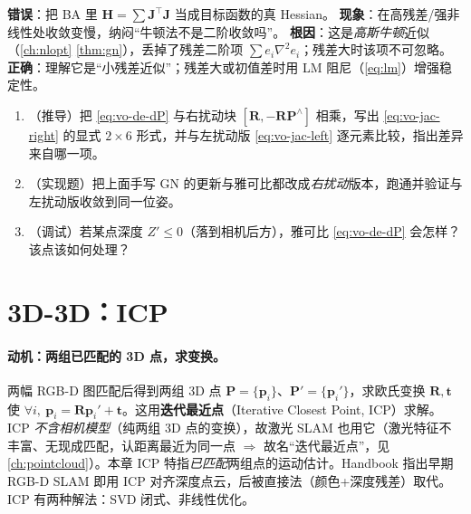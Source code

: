\begin{pitfall}
\textbf{错误}：把 BA 里 $\mathbf{H}=\sum\mathbf{J}^\top\mathbf{J}$ 当成目标函数的真 Hessian。
\textbf{现象}：在高残差/强非线性处收敛变慢，纳闷“牛顿法不是二阶收敛吗”。
\textbf{根因}：这是\emph{高斯牛顿}近似（\cref{ch:nlopt} \cref{thm:gn}），丢掉了残差二阶项 $\sum e_i\nabla^2 e_i$；残差大时该项不可忽略。
\textbf{正确}：理解它是“小残差近似”；残差大或初值差时用 LM 阻尼（\cref{eq:lm}）增强稳定性。
\end{pitfall}

\begin{practice}
\begin{enumerate}
  \item （推导）把 \cref{eq:vo-de-dP} 与右扰动块 $[\mathbf{R},-\mathbf{R}\mathbf{P}^\wedge]$ 相乘，写出 \cref{eq:vo-jac-right} 的显式 $2\times6$ 形式，并与左扰动版 \cref{eq:vo-jac-left} 逐元素比较，指出差异来自哪一项。
  \item （实现题）把上面手写 GN 的更新与雅可比都改成\emph{右扰动}版本，跑通并验证与左扰动版收敛到同一位姿。
  \item （调试）若某点深度 $Z'\le0$（落到相机后方），雅可比 \cref{eq:vo-de-dP} 会怎样？该点该如何处理？
\end{enumerate}
\end{practice}

\section{3D-3D：ICP}
\label{sec:vo-icp}

\paragraph{动机：两组已匹配的 3D 点，求变换。}两幅 RGB-D 图匹配后得到两组 3D 点 $\mathbf{P}=\{\mathbf{p}_i\}$、$\mathbf{P}'=\{\mathbf{p}_i'\}$，求欧氏变换 $\mathbf{R},\mathbf{t}$ 使 $\forall i,\ \mathbf{p}_i=\mathbf{R}\mathbf{p}_i'+\mathbf{t}$\cite{gaoxiang2019slam14}。这用\textbf{迭代最近点}（Iterative Closest Point, ICP）求解。ICP \emph{不含相机模型}（纯两组 3D 点的变换），故激光 SLAM 也用它（激光特征不丰富、无现成匹配，认距离最近为同一点 $\Rightarrow$ 故名“迭代最近点”，见 \cref{ch:pointcloud}）。本章 ICP 特指\emph{已匹配}两组点的运动估计。Handbook\cite{carlone2026handbook} 指出早期 RGB-D SLAM 即用 ICP 对齐深度点云，后被直接法（颜色+深度残差）取代。ICP 有两种解法：SVD 闭式、非线性优化。

